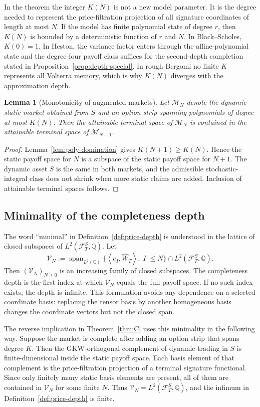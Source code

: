 \documentclass[11pt,oneside]{article}
\theoremstyle{plain}
\newtheorem{lemma}[theorem]{Lemma}
\theoremstyle{definition}
\theoremstyle{remark}
\newcommand{\Q}{\mathbb{Q}}
\newcommand{\cW}{\widehat W}
\newcommand{\FS}{\mathcal F^S}
\newcommand{\inner}[2]{\left\langle #1,#2\right\rangle}
\newcommand{\clspan}{\overline{\operatorname{span}}}
\begin{document}
In the theorem the integer $K(N)$ is not a new model parameter. It is the degree needed to represent the price-filtration projection of all signature coordinates of length at most $N$. If the model has finite polynomial state of degree $r$, then $K(N)$ is bounded by a deterministic function of $r$ and $N$. In Black--Scholes, $K(0)=1$. In Heston, the variance factor enters through the affine-polynomial state and the degree-four payoff class suffices for the second-depth completion stated in Proposition~\ref{prop:depth-special}. In rough Bergomi no finite $K$ represents all Volterra memory, which is why $K(N)$ diverges with the approximation depth.

\begin{lemma}[Monotonicity of augmented markets]
\label{lem:augmented-market-monotone}
Let $\mathcal M_N$ denote the dynamic-static market obtained from $S$ and an option strip spanning polynomials of degree at most $K(N)$. Then the attainable terminal space of $\mathcal M_N$ is contained in the attainable terminal space of $\mathcal M_{N+1}$.
\end{lemma}

\begin{proof}
Lemma~\ref{lem:poly-domination} gives $K(N+1)\geq K(N)$. Hence the static payoff space for $N$ is a subspace of the static payoff space for $N+1$. The dynamic asset $S$ is the same in both markets, and the admissible stochastic-integral class does not shrink when more static claims are added. Inclusion of attainable terminal spaces follows.
\end{proof}

\subsection{Minimality of the completeness depth}
\label{subsec:minimality-depth-expanded}
The word ``minimal'' in Definition~\ref{def:price-depth} is understood in the lattice of closed subspaces of $L^2(\FS_T,\Q)$. Let
\[
\mathcal V_N:=\clspan_{L^2(\Q)}\{\inner{e_I}{\cW_T}: |I|\leq N\}\cap L^2(\FS_T,\Q).
\]
Then $(\mathcal V_N)_{N\geq0}$ is an increasing family of closed subspaces. The completeness depth is the first index at which $\mathcal V_N$ equals the full payoff space. If no such index exists, the depth is infinite. This formulation avoids any dependence on a selected coordinate basis: replacing the tensor basis by another homogeneous basis changes the coordinate vectors but not the closed span.

The reverse implication in Theorem~\ref{thm:C} uses this minimality in the following way. Suppose the market is complete after adding an option strip that spans degree $K$. Then the GKW-orthogonal complement of dynamic trading in $S$ is finite-dimensional inside the static payoff space. Each basis element of that complement is the price-filtration projection of a terminal signature functional. Since only finitely many static basis elements are present, all of them are contained in $\mathcal V_N$ for some finite $N$. Thus $\mathcal V_N=L^2(\FS_T,\Q)$, and the infimum in Definition~\ref{def:price-depth} is finite.
\end{document}
